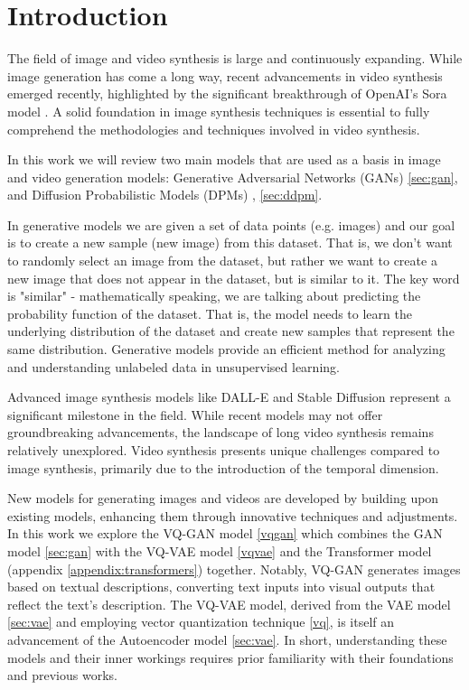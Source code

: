 \section{Introduction}

The field of image and video synthesis is large and continuously expanding. While image generation has come a long way, recent advancements in video synthesis emerged recently, highlighted by the significant breakthrough of OpenAI's Sora model \cite{sora_website}. A solid foundation in image synthesis techniques is essential to fully comprehend the methodologies and techniques involved in video synthesis.

In this work we will review two main models that are used as a basis in image and video generation models: Generative Adversarial Networks (GANs) \cite{gan} \ref{sec:gan}, and Diffusion Probabilistic Models (DPMs) \cite{diffusion_models} \cite{ddpm}, \ref{sec:ddpm}.

In generative models we are given a set of data points (e.g. images) and our goal is to create a new sample (new image) from this dataset. That is, we don't want to randomly select an image from the dataset, but rather we want to create a new image that does not appear in the dataset, but is similar to it. The key word is "similar" - mathematically speaking, we are talking about predicting the probability function of the dataset. That is, the model needs to learn the underlying distribution of the dataset and create new samples that represent the same distribution. Generative models provide an efficient method for analyzing and understanding unlabeled data in unsupervised learning.

Advanced image synthesis models like DALL-E \cite{dalle} and Stable Diffusion \cite{stable_diffusion} represent a significant milestone in the field. While recent models may not offer groundbreaking advancements, the landscape of long video synthesis remains relatively unexplored. Video synthesis presents unique challenges compared to image synthesis, primarily due to the introduction of the temporal dimension.

New models for generating images and videos are developed by building upon existing models, enhancing them through innovative techniques and adjustments. In this work we explore the VQ-GAN model \cite{vqgan} \ref{vqgan} which combines the GAN model \cite{gan} \ref{sec:gan} with the VQ-VAE model \cite{vqvae} \ref{vqvae} and the Transformer model \cite{transformer} (appendix \ref{appendix:transformers}) together. Notably, VQ-GAN generates images based on textual descriptions, converting text inputs into visual outputs that reflect the text's description. The VQ-VAE model, derived from the VAE model \cite{vae} \ref{sec:vae} and employing vector quantization technique \cite{vqvae} \ref{vq}, is itself an advancement of the Autoencoder model \cite{autoencoder} \ref{sec:vae}. In short, understanding these models and their inner workings requires prior familiarity with their foundations and previous works.

